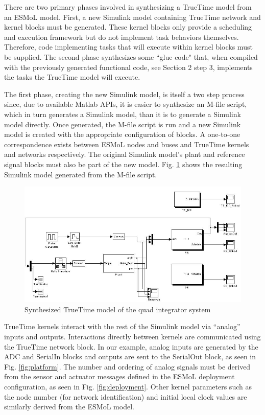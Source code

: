 There are two primary phases involved in synthesizing a TrueTime model from an ESMoL model.  First, a new Simulink model containing TrueTime network and kernel blocks must be generated.  These kernel blocks only provide a scheduling and execution framework but do not implement task behaviors themselves.  Therefore, code implementing tasks that will execute within kernel blocks must be supplied.  The second phase synthesizes some ``glue code" that, when compiled with the previously generated functional code, see Section 2 step 3, implements the tasks the TrueTime model will execute.

The first phase, creating the new Simulink model, is itself a two step process since, due to available Matlab APIs, it is easier to synthesize an M-file script, which in turn generates a Simulink model, than it is to generate a Simulink model directly.  Once generated, the M-file script is run and a new Simulink model is created with the appropriate configuration of blocks.  A one-to-one correspondence exists between ESMoL nodes and buses and TrueTime kernels and networks respectively.  The original Simulink model's plant and reference signal blocks must also be part of the new model.  Fig. \ref{fig:truetime_model} shows the resulting Simulink model generated from the M-file script.
\begin{figure}[ht]
\centering
\includegraphics[width=\columnwidth]{figures/truetime.jpg}
    \caption{Synthesized TrueTime model of the quad integrator system}
    \label{fig:truetime_model}
\end{figure}
TrueTime kernels interact with the rest of the Simulink model via ``analog'' inputs and outputs.  Interactions directly between kernels are communicated using the TrueTime network block.  In our example, analog inputs are generated by the ADC and SerialIn blocks and outputs are sent to the SerialOut block, as seen in Fig. \ref{fig:platform}.  The number and ordering of analog signals must be derived from the sensor and actuator messages defined in the ESMoL deployment configuration, as seen in Fig. \ref{fig:deployment}.  Other kernel parameters such as the node number (for network identification) and initial local clock values are similarly derived from the ESMoL model.

